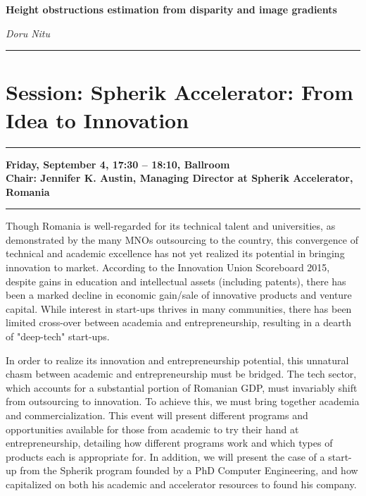 	    {\bf Height obstructions estimation from disparity and image gradients} \nopagebreak

	    {\it Doru Nitu} \nopagebreak
	    \\
	    \noindent\rule{\textwidth}{0.4pt}
        
            


\section{{\bf \large Session: %
Spherik Accelerator:  From Idea to Innovation
}} \vspace{-15pt} %
	    \noindent\rule{\textwidth}{0.4pt}
{\bf  
Friday, September 4, 17:30 -- 18:10, Ballroom
} \\ \nopagebreak
{\bf  Chair: 
Jennifer K. Austin, Managing Director at Spherik Accelerator, Romania
} \\ \nopagebreak 
	    \noindent\rule{\textwidth}{0.4pt}


Though Romania is well-regarded for its technical talent and universities, as demonstrated by the many MNOs outsourcing to the 
country, this convergence of technical and academic excellence has not yet realized its potential in bringing innovation to market.  
According to the Innovation Union Scoreboard 2015, despite gains in education and intellectual assets (including patents), there 
has been a marked decline in economic gain/sale of innovative products and venture capital.  While interest in start-ups thrives 
in many communities, there has been limited cross-over between academia and entrepreneurship, resulting in a dearth of "deep-tech" start-ups.

In order to realize its innovation and entrepreneurship potential, this unnatural chasm between academic and entrepreneurship must be bridged.  
The tech sector, which accounts for a substantial portion of Romanian GDP, must invariably shift from outsourcing to innovation.  To achieve 
this, we must bring together academia and commercialization.  This event will present different programs and opportunities available for those 
from academic to try their hand at entrepreneurship, detailing how different programs work and which types of products each is appropriate 
for.  In addition, we will present the case of a start-up from the Spherik program founded by a PhD Computer Engineering, and how 
capitalized on both his academic and accelerator resources to found his company.

